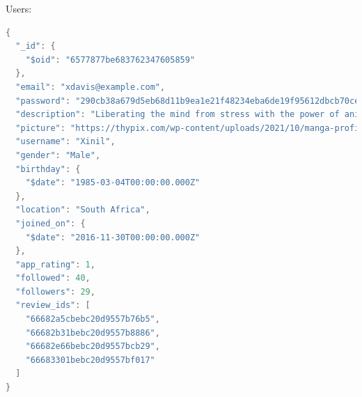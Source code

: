 \newpage

Users:
\begin{mdframed}[backgroundcolor=yellow!20, innerleftmargin=10pt, innerrightmargin=10pt]
    \begin{lstlisting}[language=java]
      {
  "_id": {
    "$oid": "6577877be683762347605859"
  },
  "email": "xdavis@example.com",
  "password": "290cb38a679d5eb68d11b9ea1e21f48234eba6de19f95612dbcb70ce0c7e4e78",
  "description": "Liberating the mind from stress with the power of anime zen.",
  "picture": "https://thypix.com/wp-content/uploads/2021/10/manga-profile-picture-44.jpg",
  "username": "Xinil",
  "gender": "Male",
  "birthday": {
    "$date": "1985-03-04T00:00:00.000Z"
  },
  "location": "South Africa",
  "joined_on": {
    "$date": "2016-11-30T00:00:00.000Z"
  },
  "app_rating": 1,
  "followed": 40,
  "followers": 29,
  "review_ids": [
    "66682a5cbebc20d9557b76b5",
    "66682b31bebc20d9557b8886",
    "66682e66bebc20d9557bcb29",
    "66683301bebc20d9557bf017"
  ]
}
    \end{lstlisting}
\end{mdframed}

\newpage

